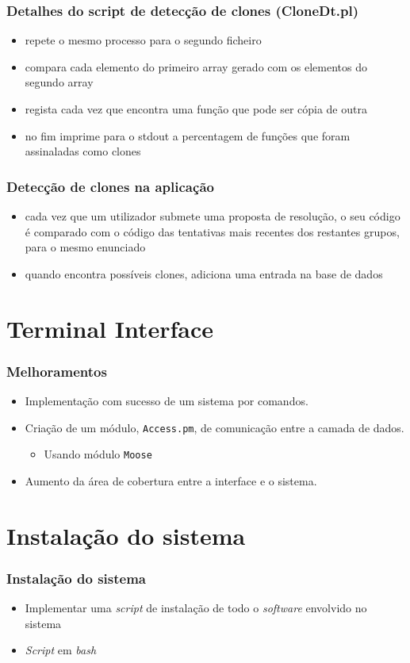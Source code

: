\documentclass{beamer}
\begin{document}
\begin{frame}[fragile] \frametitle{Detalhes do script de detecção de clones (CloneDt.pl)}
\begin{itemize}
\item repete o mesmo processo para o segundo ficheiro
\item compara cada elemento do primeiro array gerado com os elementos do segundo array
\item regista cada vez que encontra uma função que pode ser cópia de outra
\item no fim imprime para o stdout a percentagem de funções que foram assinaladas como clones
\end{itemize}
\end{frame}

\begin{frame}[fragile] \frametitle{Detecção de clones na aplicação}
\begin{itemize}
\item cada vez que um utilizador submete uma proposta de resolução, o seu código é comparado com o código das tentativas mais recentes dos restantes grupos, para o mesmo enunciado
\item quando encontra possíveis clones, adiciona uma entrada na base de dados
\end{itemize}
\end{frame}


\section{Terminal Interface}
\begin{frame}[fragile] \frametitle{Melhoramentos}
\begin{itemize}
 \item Implementação com sucesso de um sistema por comandos.
 \item Criação de um módulo, \texttt{Access.pm}, de comunicação entre a camada de dados.
\begin{itemize}
 \item Usando módulo \texttt{Moose}
\end{itemize}
 \item Aumento da área de cobertura entre a interface e o sistema.
\end{itemize}
\end{frame}

\section{Instalação do sistema}
\begin{frame}[fragile] \frametitle{Instalação do sistema}

\begin{itemize}
 \item Implementar uma \emph{script} de instalação de todo o \emph{software} envolvido no sistema
 \item \emph{Script} em \emph{bash}
\end{itemize}
\end{frame}
\end{document}
